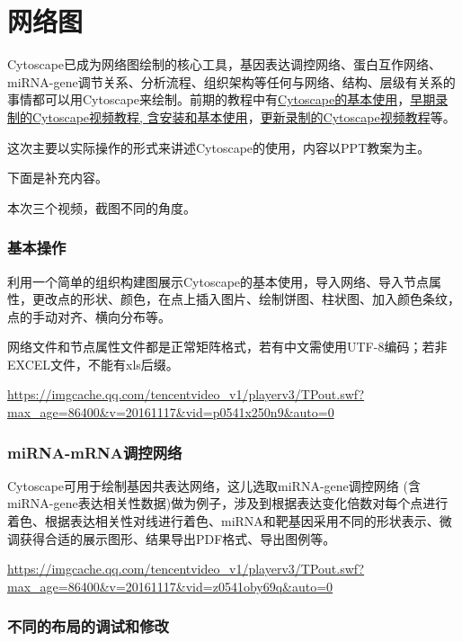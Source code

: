 \documentclass[]{article}
\numberwithin{figure}{section}
\numberwithin{table}{section}
\theoremstyle{definition}
\theoremstyle{definition}
\theoremstyle{definition}
\theoremstyle{remark}
\begin{document}
\section{网络图}\label{cytoscape}

Cytoscape已成为网络图绘制的核心工具，基因表达调控网络、蛋白互作网络、miRNA-gene调节关系、分析流程、组织架构等任何与网络、结构、层级有关系的事情都可以用Cytoscape来绘制。前期的教程中有\href{http://mp.weixin.qq.com/s/ZSoW7-qWs3BuSB7bkDnfmA}{Cytoscape的基本使用}，\href{http://mp.weixin.qq.com/s/Q30mdC26UqffBcbtFxpnXg}{早期录制的Cytoscape视频教程,
含安装和基本使用}，\href{http://mp.weixin.qq.com/s/sKEy_Pn9qnWw4W-aXraA5g}{更新录制的Cytoscape视频教程}等。

这次主要以实际操作的形式来讲述Cytoscape的使用，内容以PPT教案为主。

下面是补充内容。

本次三个视频，截图不同的角度。

\subsubsection{基本操作}

利用一个简单的组织构建图展示Cytoscape的基本使用，导入网络、导入节点属性，更改点的形状、颜色，在点上插入图片、绘制饼图、柱状图、加入颜色条纹，点的手动对齐、横向分布等。

网络文件和节点属性文件都是正常矩阵格式，若有中文需使用UTF-8编码；若非EXCEL文件，不能有xls后缀。

\url{https://imgcache.qq.com/tencentvideo_v1/playerv3/TPout.swf?max_age=86400\&v=20161117\&vid=p0541x250n9\&auto=0}

\subsubsection{miRNA-mRNA调控网络}\label{mirna-mrna}

Cytoscape可用于绘制基因共表达网络，这儿选取miRNA-gene调控网络
(含miRNA-gene表达相关性数据)做为例子，涉及到根据表达变化倍数对每个点进行着色、根据表达相关性对线进行着色、miRNA和靶基因采用不同的形状表示、微调获得合适的展示图形、结果导出PDF格式、导出图例等。

\url{https://imgcache.qq.com/tencentvideo_v1/playerv3/TPout.swf?max_age=86400\&v=20161117\&vid=z0541oby69q\&auto=0}

\subsubsection{不同的布局的调试和修改}
\end{document}
